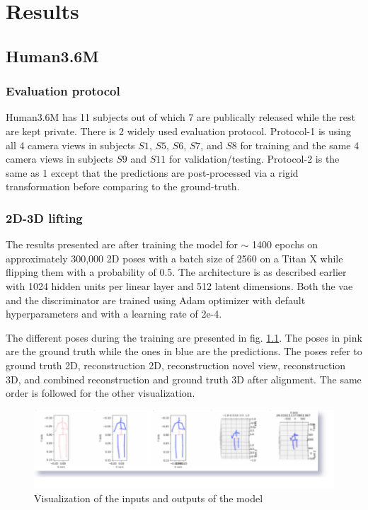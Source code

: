 \chapter{Results} %

\section{Human3.6M}
\subsection{Evaluation protocol}
Human3.6M has 11 subjects out of which 7 are publically released while the rest are kept private. There is 2 widely used evaluation protocol. Protocol-1 is using all 4 camera views in subjects $S1$, $S5$, $S6$, $S7$, and $S8$ for training and the same 4 camera views in subjects $S9$ and $S11$ for validation/testing. Protocol-2 is the same as 1 except that the predictions are post-processed via a rigid transformation
before comparing to the ground-truth.


\subsection{2D-3D lifting}

The results presented are after training the model for $\sim$ 1400 epochs on approximately 300,000 2D poses with a batch size of 2560 on a Titan X while flipping them with a probability of 0.5. The architecture is as described earlier with 1024 hidden units per linear layer and 512 latent dimensions. Both the \ac{vae} and the discriminator are trained using Adam optimizer with default hyperparameters and with a learning rate of 2e-4. 

The different poses during the training are presented in fig. \ref{fig:sample_pred}. The poses in pink are the ground truth while the ones in blue are the predictions. The poses refer to ground truth 2D, reconstruction 2D, reconstruction novel view, reconstruction 3D, and combined reconstruction and ground truth 3D after alignment. The same order is followed for the other visualization. 

\begin{figure}[!h]
    \centering
    \includegraphics[scale=0.4]{figures/sample_pred.png}
    \caption{Visualization of the inputs and outputs of the model}
    \label{fig:sample_pred}
\end{figure}

